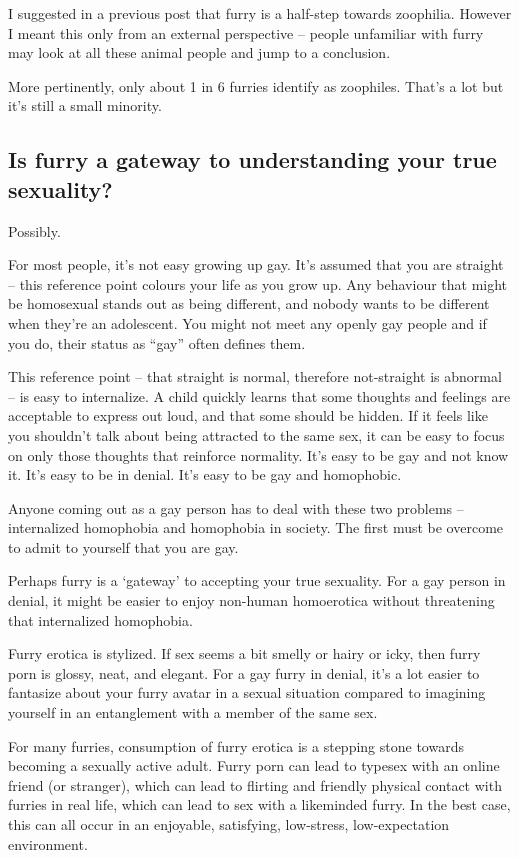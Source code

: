 I suggested in a previous post that furry is a half-step towards zoophilia. However I meant this only from an external perspective -- people unfamiliar with furry may look at all these animal people and jump to a conclusion.

More pertinently, only about 1 in 6 furries identify as zoophiles. That’s a lot but it’s still a small minority.

\subsection*{Is furry a gateway to understanding your true sexuality?}

Possibly.

For most people, it’s not easy growing up gay. It’s assumed that you are straight -- this reference point colours your life as you grow up. Any behaviour that might be homosexual stands out as being different, and nobody wants to be different when they’re an adolescent. You might not meet any openly gay people and if you do, their status as ``gay'' often defines them.

This reference point -- that straight is normal, therefore not-straight is abnormal -- is easy to internalize. A child quickly learns that some thoughts and feelings are acceptable to express out loud, and that some should be hidden. If it feels like you shouldn’t talk about being attracted to the same sex, it can be easy to focus on only those thoughts that reinforce normality. It’s easy to be gay and not know it. It’s easy to be in denial. It’s easy to be gay and homophobic.

Anyone coming out as a gay person has to deal with these two problems -- internalized homophobia and homophobia in society. The first must be overcome to admit to yourself that you are gay.

Perhaps furry is a ‘gateway’ to accepting your true sexuality. For a gay person in denial, it might be easier to enjoy non-human homoerotica without threatening that internalized homophobia.

Furry erotica is stylized. If sex seems a bit smelly or hairy or icky, then furry porn is glossy, neat, and elegant. For a gay furry in denial, it’s a lot easier to fantasize about your furry avatar in a sexual situation compared to imagining yourself in an entanglement with a member of the same sex.

For many furries, consumption of furry erotica is a stepping stone towards becoming a sexually active adult. Furry porn can lead to typesex with an online friend (or stranger), which can lead to flirting and friendly physical contact with furries in real life, which can lead to sex with a likeminded furry. In the best case, this can all occur in an enjoyable, satisfying, low-stress, low-expectation environment.

